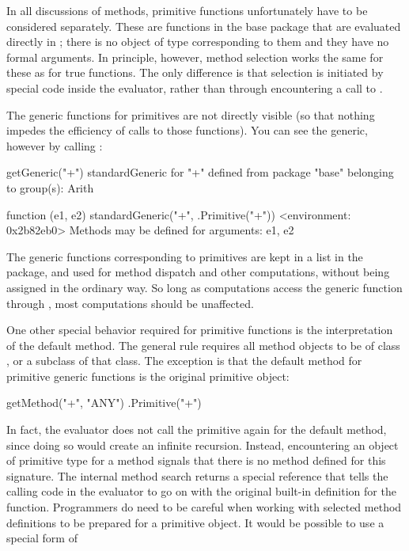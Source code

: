 \documentclass[11pt]{article}
\begin{document}
In all discussions of methods, primitive functions unfortunately have to be considered separately.
These are functions in the base package that are evaluated directly in \C{}; there is no object of type  corresponding to them and they have no formal arguments.
In principle, however, method selection works the same for these as for true functions.
The only difference is that selection is initiated by special code inside the \R{} evaluator, rather than through encountering a call to .

The generic functions for primitives are not directly visible (so that nothing impedes the efficiency of calls to those functions).
You can see the generic, however by calling :
\begin{Example}
\SPrompt{}getGeneric("+")
standardGeneric for "+" defined from package "base"
  belonging to group(s): Arith

function (e1, e2)
standardGeneric("+", .Primitive("+"))
<environment: 0x2b82eb0>
Methods may be defined for arguments: e1, e2
\end{Example}
The generic functions corresponding to primitives are kept in a list in the  package, and used for method dispatch and other computations, without being assigned in the ordinary way.
So long as computations access the generic function through , most computations should be unaffected.

One other special behavior required for primitive functions is the interpretation of the default method.
The general rule requires all method objects to be of class , or a subclass of that class.
The exception is that the default method for primitive generic functions is the original primitive object:
\begin{Example}
\SPrompt{}getMethod("+", "ANY")
.Primitive("+")
\end{Example}
In fact, the evaluator does not call the primitive again for the default method, since doing so would create an infinite recursion.
Instead, encountering an object of primitive type for a method signals that there is no method defined for this signature.
The internal method search returns a special reference that tells the calling code in the evaluator to go on with the original built-in definition for the function.
Programmers do need to be careful when working with selected method definitions to be prepared for a primitive object.
It would be possible to use a special form of
\end{document}
